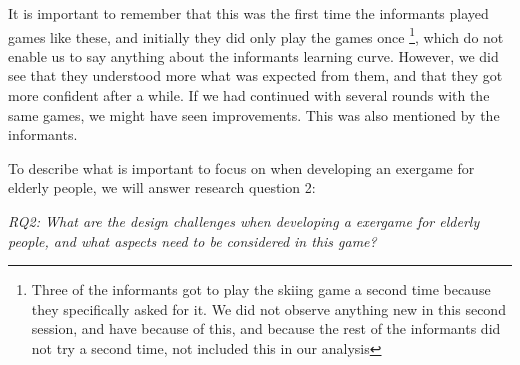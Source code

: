 It is important to remember that this was the first time the informants played games like these, and initially they did only play the games once \footnote{Three of the informants got to play the skiing game a second time because they specifically asked for it. We did not observe anything new in this second session, and have because of this, and because the rest of the informants did not try a second time, not included this in our analysis}, which do not enable us to say anything about the informants learning curve. However, we did see that they understood more what was expected from them, and that they got more confident after a while. If we had continued with several rounds with the same games, we might have seen improvements. This was also mentioned by the informants. 

To describe what is important to focus on when developing an exergame for elderly people, we will answer research question 2:

\emph{RQ2: What are the design challenges when developing a exergame for elderly people, and what aspects need to be considered in this game?}

